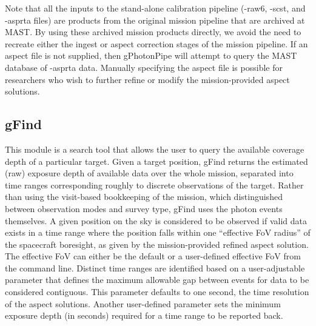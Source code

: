 \documentclass[5p]{elsarticle}
\begin{document}
Note that all the inputs to the stand-alone calibration pipeline (-raw6, -scst, and -asprta files) are products from the original mission pipeline that are archived at MAST.  By using these archived mission products directly, we avoid the need to recreate either the ingest or aspect correction stages of the mission pipeline. If an aspect file is not supplied, then gPhotonPipe will attempt to query the MAST database of -asprta data.  Manually specifying the aspect file is possible for researchers who wish to further refine or modify the mission-provided aspect solutions.

\subsection{gFind}
This module is a search tool that allows the user to query the available coverage depth of a particular target. Given a target position, gFind returns the estimated (raw) exposure depth of available data over the whole mission, separated into time ranges corresponding roughly to discrete observations of the target. Rather than using the visit-based bookkeeping of the mission, which distinguished between observation modes and survey type, gFind uses the photon events themselves. A given position on the sky is considered to be observed if valid data exists in a time range where the position falls within one ``effective FoV radius'' of the spacecraft boresight, as given by the mission-provided refined aspect solution.  The effective FoV can either be the default or a user-defined effective FoV from the command line.  Distinct time ranges are identified based on a user-adjustable parameter that defines the maximum allowable gap between events for data to be considered contiguous.  This parameter defaults to one second, the time resolution of the aspect solutions. Another user-defined parameter sets the minimum exposure depth (in seconds) required for a time range to be reported back.
\end{document}
